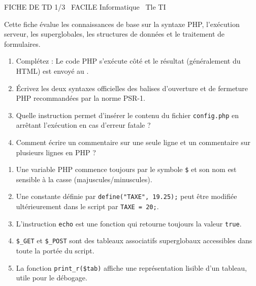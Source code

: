 \documentclass[11pt]{article}
\begin{document}
\begin{tcolorbox}[enhanced,colback=popink,colframe=popink,arc=10pt,boxrule=0pt,left=12pt,right=12pt,top=9pt,bottom=9pt]
{\color{white}\popxbold\small FICHE DE TD 1/3 \textbullet\ FACILE \hfill Informatique \textbullet\ Tle TI\par}
\end{tcolorbox}
\vspace{4pt}
Cette fiche évalue les connaissances de base sur la syntaxe PHP, l'exécution serveur, les superglobales, les structures de données et le traitement de formulaires.

\begin{exercice}
\begin{enumerate}
    \item Complétez : Le code PHP s'exécute côté \underline{\hspace{3cm}} et le résultat (généralement du HTML) est envoyé au \underline{\hspace{3cm}}.
    \item Écrivez les deux syntaxes officielles des balises d'ouverture et de fermeture PHP recommandées par la norme PSR-1.
    \item Quelle instruction permet d'insérer le contenu du fichier \texttt{config.php} en arrêtant l'exécution en cas d'erreur fatale ?
    \item Comment écrire un commentaire sur une seule ligne et un commentaire sur plusieurs lignes en PHP ?
\end{enumerate}
\end{exercice}

\begin{exercice}
\begin{enumerate}
    \item Une variable PHP commence toujours par le symbole \texttt{\$} et son nom est sensible à la casse (majuscules/minuscules).
    \item Une constante définie par \texttt{define("TAXE", 19.25);} peut être modifiée ultérieurement dans le script par \texttt{TAXE = 20;}.
    \item L'instruction \texttt{echo} est une fonction qui retourne toujours la valeur \texttt{true}.
    \item \texttt{\$\_GET} et \texttt{\$\_POST} sont des tableaux associatifs superglobaux accessibles dans toute la portée du script.
    \item La fonction \texttt{print\_r(\$tab)} affiche une représentation lisible d'un tableau, utile pour le débogage.
\end{enumerate}
\end{exercice}
\end{document}
